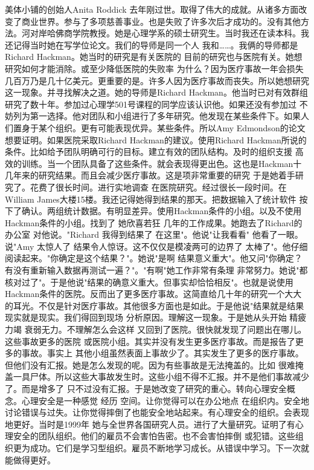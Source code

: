 美体小铺的创始人Anita Roddick 去年刚过世。取得了伟大的成就。从诸多方面改变了商业世界。参与了多项慈善事业。也是失败了许多次后才成功的。没有其他方法。河对岸哈佛商学院教授。她是心理学系的硕士研究生。当时我还在读本科。我还记得当时她在写学位论文。我们的导师是同一个人 我和……。我俩的导师都是Richard Hackman。她当时的研究是有关医院的 目前的研究也与医院有关。她想研究如何才能消除。或至少降低医院的失败率 为什么？因为医疗事故一年会损失几百万乃是几十亿美元。更重要的是。许多人因为医疗事故而丧失。所以她想研究这一现象。并寻找解决之道。她的导师是Richard Hackman。他当时已对有效群组研究了数十年。参加过心理学501号课程的同学应该认识他。如果还没有参加过 不妨列为第一选择。他对团队和小组进行了多年研究。他发现在某些条件下。如果人们置身于某个组织。更有可能表现优异。某些条件。所以Amy Edmondson的论文想要证明。如果医院采取Richard Hackman的建议。使用Richard Hackman所说的条件。比如给予团队明确可行的目标。建立有效的团队结构。及时的组织支援 高效的训练。当一个团队具备了这些条件。就会表现得更出色。这也是Hackman十几年来的研究结果。而且会减少医疗事故。这是项非常重要的研究 于是她着手研究了。花费了很长时间。进行实地调查 在医院研究。经过很长一段时间。在William James大楼15楼。我还记得她得到结果的那天。把数据输入了统计软件 按下了确认。两组统计数据。有明显差异。使用Hackman条件的小组。以及不使用Hackman条件的小组。找到了 她欣喜若狂 几年的工作成果。她跑去了Richard的办公室 对他说。"Richard 我得到结果了 在这里"。他说"让我看看" 他看了一眼。说"Amy 太惊人了 结果令人惊讶。这不仅仅是模凌两可的边界了 太棒了"。他仔细阅读起来。"你确定是这个结果？"。她说"是啊 结果意义重大"。他又问"你确定？有没有重新输入数据再测试一遍？"。"有啊"她工作非常有条理 非常努力。她说"都核对过了"。于是他说"结果的确意义重大。但事实却恰恰相反"。也就是说使用Hackman条件的医院。反而出了更多医疗事故。这简直给几十年的研究一个大大的耳光。不仅是针对医疗事故。其他很多方面也是如此。于是他说"结果就是结果 现实就是现实。我们得回到现场 分析原因。理解这一现象。于是她从头开始 精疲力竭 衰弱无力。不理解怎么会这样 又回到了医院。很快就发现了问题出在哪儿。这些事故更多的医院 或医院小组。其实并没有发生更多医疗事故。而是报告了更多的事故。事实上 其他小组虽然表面上事故少了。其实发生了更多的医疗事故。但他们没有汇报。她是怎么发现的呢。因为有些事故是无法掩盖的。比如 很难掩盖一具尸体。所以这些大事故发生时。这些小组不得不汇报。并不是他们事故减少了。而是增多了 只不过没有汇报。于是她改变了研究的重心。转向心理安全概念。心理安全是一种感觉 经历 空间。让你觉得可以在办公地点 在组织内。安全地讨论错误与过失。让你觉得摔倒了也能安全地站起来。有心理安全的组织。会表现地更好。当时是1999年 她与全世界各国研究人员。进行了大量研究。证明了有心理安全的团队组织。他们的雇员不会害怕告密。也不会害怕摔倒 或犯错。这些组织更为成功。它们是学习型组织。雇员不断地学习成长。从错误中学习。下一次就能做得更好。 

